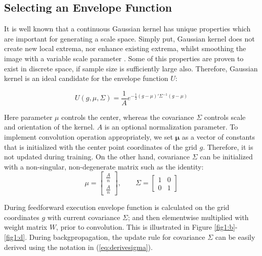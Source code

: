 \documentclass{bmvc2k}
\begin{document}
\subsection{Selecting an Envelope Function}
\label{sec:methods:gaussian}

It is well known that a continuous Gaussian kernel has unique properties which are important for generating a scale space. Simply put, Gaussian kernel does not create new local extrema, nor enhance existing extrema, whilst smoothing the image with a variable scale parameter \cite{Lindeberg:1994:STC:528688}. Some of this properties are proven to exist in discrete space, if sample size is sufficiently large also.
Therefore, Gaussian kernel is an ideal candidate for the envelope function $U$:


\begin{equation}
U(g, \mu, \Sigma) = \frac{1}{A} e ^{ - \frac{1}{2} (g-\mu)' \Sigma^{-1} (g-\mu)}
\end{equation}

Here parameter $\mu$ controls the center, whereas the covariance $\Sigma$ controls scale and orientation of the kernel. $A$ is an optional normalization parameter. To implement convolution operation appropriately, we set $\mathbf{\mu}$ as a vector of constants that is initialized with the center point coordinates of the grid $g$. Therefore, it is not updated during training. On the other hand, covariance $\Sigma$ can be initialized with a non-singular, non-degenerate matrix such as the identity:
\begin{equation}
\label{eq:initmu}
\mu = \begin{bmatrix} \frac{A}{n} \\ \frac{A}{n} \end{bmatrix}, \qquad \Sigma =  \begin{bmatrix} 1 & 0 \\ 0 & 1 \end{bmatrix}
\end{equation}


During feedforward execution envelope function is calculated on the grid coordinates $g$ with current covariance $\Sigma$; and then elementwise multiplied with weight matrix $W$, prior to convolution. This is illustrated in Figure \ref{fig1:b}-\ref{fig1:d}. During backgpropagation, the update rule for covariance $\Sigma$ can be easily derived using the notation in (\ref{eq:derivesigma}). 
\end{document}
